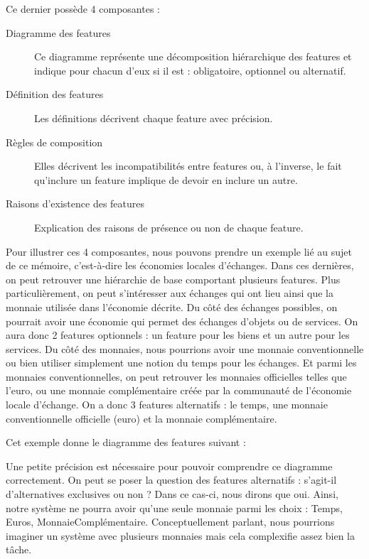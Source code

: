 Ce dernier possède 4 composantes : 

\begin{description}
	\item[Diagramme des features] Ce diagramme représente une décomposition hiérarchique des features et indique pour chacun d'eux si il est : obligatoire,  optionnel ou alternatif.
	\item[Définition des features] Les définitions décrivent chaque feature avec précision.
	\item[Règles de composition] Elles décrivent les incompatibilités entre features ou,  à l'inverse,  le fait qu'inclure un feature implique de devoir en inclure un autre.
	\item[Raisons d'existence des features] Explication des raisons de présence ou non de chaque feature.
\end{description}

Pour illustrer ces 4 composantes,  nous pouvons prendre un exemple lié au sujet de ce mémoire,  c'est-à-dire les économies locales d'échanges.  Dans ces dernières,  on peut retrouver une hiérarchie de base comportant plusieurs features.  Plus particulièrement,  on peut s'intéresser aux échanges qui ont lieu ainsi que la monnaie utilisée dans l'économie décrite.  Du côté des échanges possibles,  on pourrait avoir une économie qui permet des échanges d'objets ou de services.  On aura donc 2 features optionnels : un feature pour les biens et un autre pour les services.  Du côté des monnaies,  nous pourrions avoir une monnaie conventionnelle ou bien utiliser simplement une notion du temps pour les échanges.  Et parmi les monnaies conventionnelles,  on peut retrouver les monnaies officielles telles que l'euro,  ou une monnaie complémentaire créée par la communauté de l'économie locale d'échange.  On a donc 3 features alternatifs : le temps,  une monnaie conventionnelle officielle (euro) et la monnaie complémentaire. 

Cet exemple donne le diagramme des features suivant : \\


Une petite précision est nécessaire pour pouvoir comprendre ce diagramme correctement.  On peut se poser la question des features alternatifs : s'agit-il d'alternatives exclusives ou non ?  Dans ce cas-ci,  nous dirons que oui.  Ainsi,  notre système ne pourra avoir qu'une seule monnaie parmi les choix : Temps,  Euros,  MonnaieComplémentaire.  Conceptuellement parlant,  nous pourrions imaginer un système avec plusieurs monnaies mais cela complexifie assez bien la tâche.

